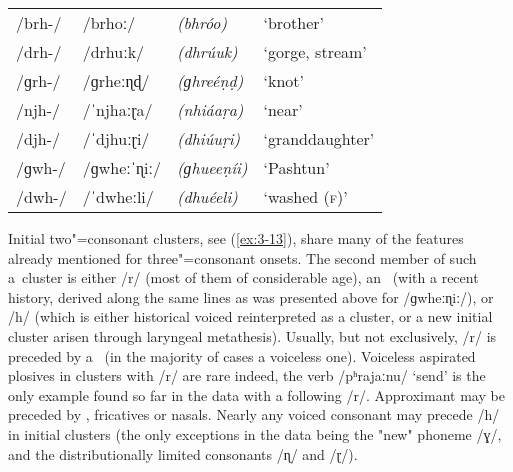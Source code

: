 \begin{exe}
\extab
\label{ex:3-12}
\begin{tabular}{ l l l l }
/brh-/ &
/brhoː/ &
\textit{(bhróo)} &
`brother'\\
/drh-/ &
/drhuːk/ &
\textit{(dhrúuk)} &
`gorge, stream' \\
/ɡrh-/ &
/ɡrheːɳɖ/ &
\textit{(ɡhreéṇḍ)} &
`knot' \\
/njh-/ &
/ˈnjhaːɽa/ &
\textit{(nhiáaṛa)} &
`near'\\
/djh-/ &
/ˈdjhuːɽi/ &
\textit{(dhiúuṛi)} &
`granddaughter'\\
/ɡwh-/ &
/ɡwheːˈɳiː/ &
\textit{(ɡhueeṇíi)} &
`Pashtun'\\
/dwh-/ &
/ˈdwheːli/ &
\textit{(dhuéeli)} &
`washed (\textsc{f)}'\\
\end{tabular}
\end{exe}


Initial two"=consonant clusters, see (\ref{ex:3-13}), share many of the features already mentioned for three"=consonant onsets. The second member of such a~cluster is either /r/ (most of them of considerable age), an~ (with a recent history, derived along the same lines as was presented above for /ɡwheːɳiː/), or /h/ (which is either historical voiced  reinterpreted as a cluster, or a new initial cluster arisen through laryngeal metathesis). Usually, but not exclusively, /r/ is preceded by a~ (in the majority of cases a voiceless one). Voiceless aspirated plosives in clusters with /r/ are rare indeed, the verb /pʰrajaːnu/ `send' is the only example found so far in the data with a following /r/. Approximant may be preceded by , fricatives or nasals. Nearly any voiced consonant may precede /h/ in initial clusters (the only exceptions in the data being the "new" phoneme /ɣ/, and the distributionally limited consonants /ɳ/ and /ɽ/).


